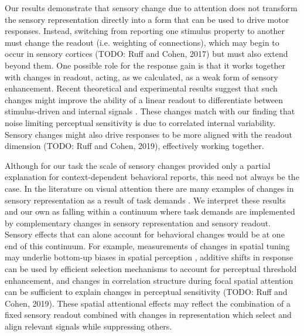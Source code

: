 \documentclass{report}
\begin{document}
Our results demonstrate that sensory change due to attention does not transform the sensory representation directly into a form that can be used to drive motor responses. Instead, switching from reporting one stimulus property to another must change the readout (i.e. weighting of connections), which may begin to occur in sensory cortices (TODO: Ruff and Cohen, 2017) but must also extend beyond them. One possible role for the response gain is that it works together with changes in readout, acting, as we calculated, as a weak form of sensory enhancement. Recent theoretical and experimental results suggest that such changes might improve the ability of a linear readout to differentiate between stimulus-driven and internal signals \citep{Ecker2016-ro,Rabinowitz2015-uz,Snyder2018-yr}. These changes match with our finding that noise limiting perceptual sensitivity is due to correlated internal variability. Sensory changes might also drive responses to be more aligned with the readout dimension (TODO: Ruff and Cohen, 2019), effectively working together.  

Although for our task the scale of sensory changes provided only a partial explanation for context-dependent behavioral reports, this need not always be the case. In the literature on visual attention there are many examples of changes in sensory representation as a result of task demands \citep{Carrasco2011-xp}. We interpret these results and our own as falling within a continuum where task demands are implemented by complementary changes in sensory representation and sensory readout. Sensory effects that can alone account for behavioral changes would be at one end of this continuum. For example, measurements of changes in spatial tuning \citep{Kay2015-pd,Klein2014-oe,Vo2017-oi} may underlie bottom-up biases in spatial perception \citep{Klein2016-ox}, additive shifts in response \citep{Buracas2007-pe,Li2008-fe,Murray2008-xj} can be used by efficient selection mechanisms \citep{Chen2012-fu,Hara2014-mv,Pestilli2011-gi} to account for perceptual threshold enhancement, and changes in correlation structure during focal spatial attention \citep{Mitchell2009-do} can be sufficient to explain changes in perceptual sensitivity \citep{Cohen2010-xs,Cohen2009-bt} (TODO: Ruff and Cohen, 2019). These spatial attentional effects may reflect the combination of a fixed sensory readout combined with changes in representation which select \citep{Carrasco2011-xp} and align \citep{Ruff2018-yx} relevant signals while suppressing others.
\end{document}
